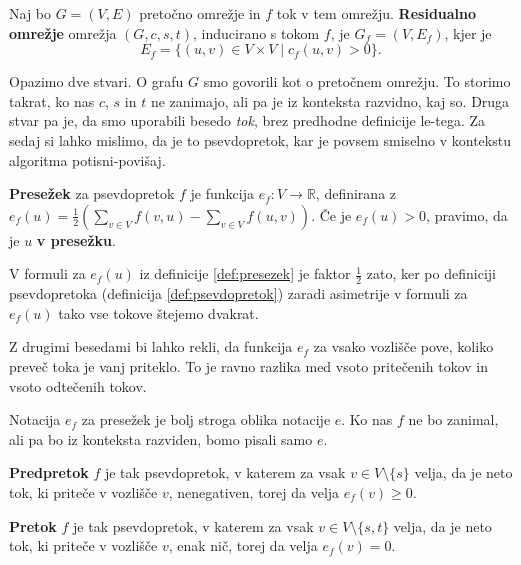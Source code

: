 \documentclass[mat1]{fmfdelo}
\begin{document}
\begin{definicija}
  Naj bo $G = (V,E)$ pretočno omrežje in $f$ tok v tem omrežju. \textbf{Residualno omrežje} omrežja $(G,c,s,t)$, inducirano s tokom $f$, je $G_f = (V,E_f)$, kjer je \[ E_f = \{ (u,v) \in V \times V \mid c_f(u,v) > 0 \}. \]
\end{definicija}

\begin{opomba}
  Opazimo dve stvari. O grafu $G$ smo govorili kot o pretočnem omrežju. To storimo takrat, ko nas $c$, $s$ in $t$ ne zanimajo, ali pa je iz konteksta razvidno, kaj so. Druga stvar pa je, da smo uporabili besedo \textit{tok}, brez predhodne definicije le-tega.
  Za sedaj si lahko mislimo, da je to psevdopretok, kar je povsem smiselno v kontekstu algoritma potisni-povišaj.
\end{opomba}

\begin{definicija}\label{def:presezek}
\textbf{Presežek} za psevdopretok $f$ je funkcija $e_f \colon V \rightarrow \mathbb{R}$, definirana z $e_f(u) = \frac{1}{2}\left(\sum_{v \in V} f(v,u) - \sum_{v \in V} f(u,v)\right)$. Če je $e_f(u) > 0$, pravimo, da je $u$ \textbf{v presežku}.
\end{definicija}

\begin{opomba}
  V formuli za $e_f(u)$ iz definicije \ref{def:presezek} je faktor $\frac{1}{2}$ zato, ker po definiciji psevdopretoka (definicija \ref{def:psevdopretok}) zaradi asimetrije v formuli za $e_f(u)$ tako vse tokove štejemo dvakrat.
\end{opomba}

Z drugimi besedami bi lahko rekli, da funkcija $e_f$ za vsako vozlišče pove, koliko preveč toka je vanj priteklo. To je ravno razlika med vsoto pritečenih tokov in vsoto odtečenih tokov.

\begin{opomba}
  Notacija $e_f$ za presežek je bolj stroga oblika notacije $e$. Ko nas $f$ ne bo zanimal, ali pa bo iz konteksta razviden, bomo pisali samo $e$.
\end{opomba}

\begin{definicija}
\textbf{Predpretok} $f$ je tak psevdopretok, v katerem za vsak $v \in V \setminus\{s\}$ velja, da je neto tok, ki priteče v vozlišče $v$, nenegativen, torej da velja $e_f(v) \geq 0$.
\end{definicija}

\begin{definicija}
\textbf{Pretok} $f$ je tak psevdopretok, v katerem za vsak $v \in V \setminus\{s,t\}$ velja, da je neto tok, ki priteče v vozlišče $v$, enak nič, torej da velja $e_f(v) = 0$.
\end{definicija}
\end{document}
